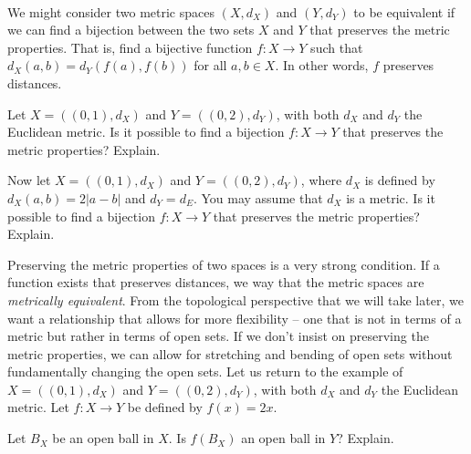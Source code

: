 \begin{pa} ~
\be
\item We might consider two metric spaces $(X, d_X)$ and $(Y, d_Y)$ to be equivalent if we can find a bijection between the two sets $X$ and $Y$ that preserves the metric properties. That is, find a bijective function $f : X \to Y$ such that $d_X(a,b) = d_Y(f(a), f(b))$ for all $a,b \in X$. In other words, $f$ preserves distances. 
	\ba
	\item Let $X = ((0,1), d_X)$ and $Y = ((0,2), d_Y)$, with both $d_X$ and $d_Y$ the Euclidean metric. Is it possible to find a bijection $f : X \to Y$ that preserves the metric properties? Explain. 
	
\item Now let $X = ((0,1), d_X)$ and $Y = ((0,2), d_Y)$, where $d_X$ is defined by $d_X(a,b) = 2 | a-b |$ and $d_Y = d_E$. You may assume that $d_X$ is a metric. Is it possible to find a bijection $f : X \to Y$ that preserves the metric properties? Explain. 

	\ea






\item Preserving the metric properties of two spaces is a very strong condition. If a function exists that preserves distances, we way that the metric spaces are \emph{metrically equivalent}. From the topological perspective that we will take later, we want a relationship that allows for more flexibility -- one that is not in terms of a metric but rather in terms of open sets. If we don't insist on preserving the metric properties, we can allow for stretching and bending of open sets without fundamentally changing the open sets. Let us return to the example of $X = ((0,1), d_X)$ and $Y = ((0,2), d_Y)$, with both $d_X$ and $d_Y$ the Euclidean metric. Let $f : X \to Y$ be defined by $f(x) = 2x$. 
	\ba
	\item Let $B_X$ be an open ball in $X$. Is $f(B_X)$ an open ball in $Y$? Explain.


\end{pa}
